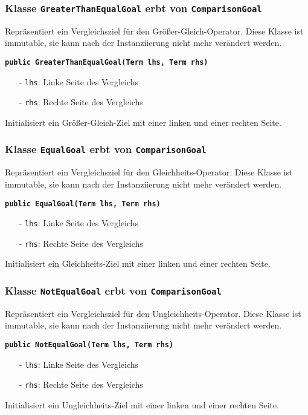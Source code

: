 \documentclass[parskip=full,11pt,twoside]{scrartcl}
\begin{document}
\subsubsection{Klasse \texttt{GreaterThanEqualGoal} erbt von \texttt{ComparisonGoal}}
Repräsentiert ein Vergleichsziel für den Größer-Gleich-Operator. Diese Klasse ist immutable, sie kann nach der Instanziierung nicht mehr verändert werden.

\textbf{\texttt{public GreaterThanEqualGoal(Term lhs, Term rhs)}}
\begin{itemize}[noitemsep]
	\item[-] \texttt{lhs}: Linke Seite des Vergleichs
	\item[-] \texttt{rhs}: Rechte Seite des Vergleichs
\end{itemize}
Initialisiert ein Größer-Gleich-Ziel mit einer linken und einer rechten Seite.

\subsubsection{Klasse \texttt{EqualGoal} erbt von \texttt{ComparisonGoal}}
Repräsentiert ein Vergleichsziel für den Gleichheits-Operator. Diese Klasse ist immutable, sie kann nach der Instanziierung nicht mehr verändert werden.

\textbf{\texttt{public EqualGoal(Term lhs, Term rhs)}}
\begin{itemize}[noitemsep]
	\item[-] \texttt{lhs}: Linke Seite des Vergleichs
	\item[-] \texttt{rhs}: Rechte Seite des Vergleichs
\end{itemize}
Initialisiert ein Gleichheits-Ziel mit einer linken und einer rechten Seite.
\newpage
\subsubsection{Klasse \texttt{NotEqualGoal} erbt von \texttt{ComparisonGoal}}
Repräsentiert ein Vergleichsziel für den Ungleichheits-Operator. Diese Klasse ist immutable, sie kann nach der Instanziierung nicht mehr verändert werden.

\textbf{\texttt{public NotEqualGoal(Term lhs, Term rhs)}}
\begin{itemize}[noitemsep]
	\item[-] \texttt{lhs}: Linke Seite des Vergleichs
	\item[-] \texttt{rhs}: Rechte Seite des Vergleichs
\end{itemize}
Initialisiert ein Ungleichheits-Ziel mit einer linken und einer rechten Seite.
\end{document}
